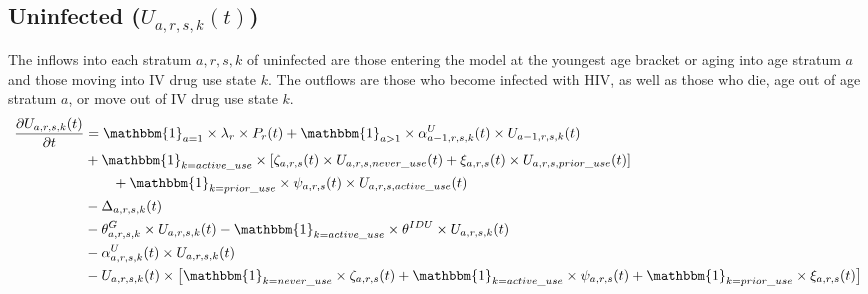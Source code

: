 \documentclass{article}
\begin{document}
\subsection{Uninfected \big($U_{a,r,s,k}(t)$\big)}
The inflows into each stratum $a,r,s,k$ of uninfected are those entering the model at the youngest age bracket or aging into age stratum $a$ and those moving into IV drug use state $k$. The outflows are those who become infected with HIV, as well as those who die, age out of age stratum $a$, or move out of IV drug use state $k$.
\begin{align*}
	\frac{\partial U_{a,r,s,k}(t)}{\partial t} 
	&= \mathbbm{1}_{a=1} \times \lambda_{r} \times P_r(t) + \mathbbm{1}_{a>1} \times \alpha_{a-1,r,s,k}^U(t) \times U_{a-1,r,s,k}(t) \\
	&+ \mathbbm{1}_{k=active\_use} \times [\zeta_{a,r,s}(t) \times U_{a,r,s,never\_use}(t) + \xi_{a,r,s}(t) \times U_{a,r,s,prior\_use}(t)]\\
	&\qquad + \mathbbm{1}_{k=prior\_use} \times \psi_{a,r,s}(t) \times U_{a,r,s,active\_use}(t)\\
	&- \Delta_{a,r,s,k}(t) \\
	&- \theta^G_{a,r,s,k} \times U_{a,r,s,k}(t) - \mathbbm{1}_{k=active\_use} \times \theta^{IDU} \times U_{a,r,s,k}(t) \\
	&- \alpha_{a,r,s,k}^U(t) \times U_{a,r,s,k}(t) \\
	&- U_{a,r,s,k}(t) \times \big[\mathbbm{1}_{k=never\_use} \times \zeta_{a,r,s}(t) + \mathbbm{1}_{k=active\_use} \times \psi_{a,r,s}(t) + \mathbbm{1}_{k=prior\_use} \times \xi_{a,r,s}(t)\big]
\end{align*}
\end{document}
